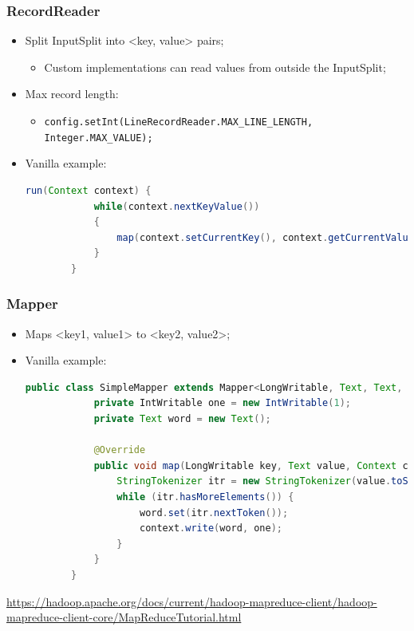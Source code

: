 \documentclass[aspectratio=169]{beamer}
\begin{document}
\begin{frame}[fragile]
	\frametitle{RecordReader}

	\begin{itemize}
		\item Split InputSplit into <key, value> pairs;
		      \begin{itemize}
			      \item Custom implementations can read values from outside the InputSplit;
		      \end{itemize}
		\item Max record length:
		      \begin{itemize}
			      \item {\scriptsize \texttt{config.setInt(LineRecordReader.MAX\_LINE\_LENGTH, Integer.MAX\_VALUE);}}
		      \end{itemize}
		\item Vanilla example:
		      \begin{lstlisting}[language=java,basicstyle=\tiny,columns=fullflexible]
        run(Context context) {
            while(context.nextKeyValue())
            {
                map(context.setCurrentKey(), context.getCurrentValue(), context)
            }
        }
            \end{lstlisting}
	\end{itemize}
\end{frame}

\begin{frame}[fragile]
	\frametitle{Mapper}

	\begin{itemize}
		\item Maps <key1, value1> to <key2, value2>;
		\item Vanilla example:
		      \begin{lstlisting}[language=java,basicstyle=\tiny,columns=fullflexible]
        public class SimpleMapper extends Mapper<LongWritable, Text, Text, IntWritable> {
            private IntWritable one = new IntWritable(1);
            private Text word = new Text();

            @Override
            public void map(LongWritable key, Text value, Context context) {
                StringTokenizer itr = new StringTokenizer(value.toString());
                while (itr.hasMoreElements()) {
                    word.set(itr.nextToken());
                    context.write(word, one);
                }
            }
        }
            \end{lstlisting}
	\end{itemize}

	\begin{center}
		{\tiny \href{https://hadoop.apache.org/docs/current/hadoop-mapreduce-client/hadoop-mapreduce-client-core/MapReduceTutorial.html}{https://hadoop.apache.org/docs/current/hadoop-mapreduce-client/hadoop-mapreduce-client-core/MapReduceTutorial.html}}
	\end{center}
\end{frame}
\end{document}
